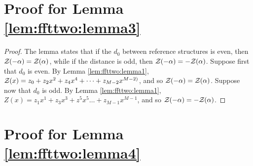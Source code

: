\section{Proof for Lemma \ref{lem:ffttwo:lemma3}}
\label{sec:ffttwo:lemma3proof}

\begin{proof}
The lemma states that if the \bpd $d_0$ between reference
structures \strAB is even, then ${\mathcal Z}_{}(-\alpha)={\mathcal Z}_{}(\alpha)$, while if
the distance is odd, then ${\mathcal Z}_{}(-\alpha)=-{\mathcal Z}_{}(\alpha)$.
Suppose first that $d_0$ is even. By Lemma \ref{lem:ffttwo:lemma1},
${\mathcal Z}_{}(x) = z_0 + z_2 x^2 + z_4 x^4 + \dots +
z_{M-2} x^{M-2)}$, and so ${\mathcal Z}_{}(-\alpha)={\mathcal Z}_{}(\alpha)$.
Suppose now that
$d_0$ is odd. By Lemma \ref{lem:ffttwo:lemma1},
$Z(x) = z_1 x^1 + z_3 x^3 + z^5 x^5 \dots +
z_{M-1} x^{M-1}$, and so ${\mathcal Z}_{}(-\alpha)=-{\mathcal Z}_{}(\alpha)$.
\end{proof}

\section{Proof for Lemma \ref{lem:ffttwo:lemma4}}
\label{sec:ffttwo:lemma4proof}

